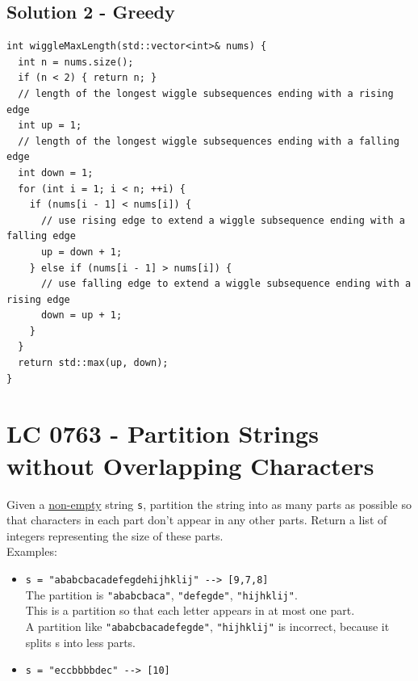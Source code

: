 \subsection*{Solution 2 - Greedy}
\begin{lstlisting}
int wiggleMaxLength(std::vector<int>& nums) {
  int n = nums.size();
  if (n < 2) { return n; }
  // length of the longest wiggle subsequences ending with a rising edge
  int up = 1;
  // length of the longest wiggle subsequences ending with a falling edge
  int down = 1;
  for (int i = 1; i < n; ++i) {
    if (nums[i - 1] < nums[i]) {
      // use rising edge to extend a wiggle subsequence ending with a falling edge
      up = down + 1;
    } else if (nums[i - 1] > nums[i]) {
      // use falling edge to extend a wiggle subsequence ending with a rising edge
      down = up + 1;
    }
  }
  return std::max(up, down);
}
\end{lstlisting}

\section{LC 0763 - Partition Strings without Overlapping Characters}
Given a \ul{non-empty} string {\colorbox{CodeBackground}{\lstinline|s|}}, partition the string into as many parts as possible so that characters in each part don't appear in any other parts. Return a list of integers representing the size of these parts.\\

Examples:
\begin{itemize}
\item {\colorbox{CodeBackground}{\lstinline|s = "ababcbacadefegdehijhklij" --> [9,7,8]|}}\\
The partition is {\colorbox{CodeBackground}{\lstinline|"ababcbaca"|}}, {\colorbox{CodeBackground}{\lstinline|"defegde"|}}, {\colorbox{CodeBackground}{\lstinline|"hijhklij"|}}.\\
This is a partition so that each letter appears in at most one part.\\
A partition like {\colorbox{CodeBackground}{\lstinline|"ababcbacadefegde"|}}, {\colorbox{CodeBackground}{\lstinline|"hijhklij"|}} is incorrect, because it splits s into less parts.
\item {\colorbox{CodeBackground}{\lstinline|s = "eccbbbbdec" --> [10]|}}
\end{itemize}

